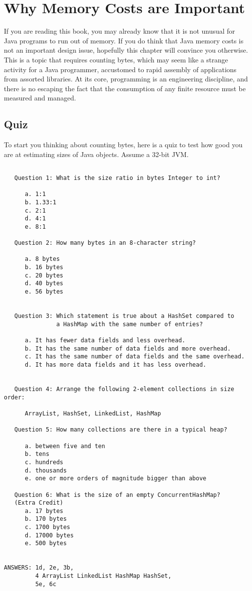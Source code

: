\chapter{Why Memory Costs are Important}

If you are reading this book, you may already know that it is not unusual for Java programs to run out of memory. If you do think that Java memory costs is not an important design issue, hopefully this chapter will convince you otherwise. This is a topic that requires counting bytes, which may seem like a strange activity for a Java programmer, accustomed to rapid assembly of applications from assorted libraries. At its core, programming is an engineering discipline, and there is no escaping the fact that the consumption of any finite resource must be measured and managed. 

\section{Quiz}

To start you thinking about counting bytes, here is a quiz to test how good you are at estimating sizes of Java objects. Assume a 32-bit JVM.
\begin{verbatim}

   Question 1: What is the size ratio in bytes Integer to int?
   
      a. 1:1
      b. 1.33:1
      c. 2:1
      d. 4:1
      e. 8:1
   
   Question 2: How many bytes in an 8-character string?

      a. 8 bytes
      b. 16 bytes
      c. 20 bytes
      d. 40 bytes
      e. 56 bytes
 
   
   Question 3: Which statement is true about a HashSet compared to 
               a HashMap with the same number of entries?
               
      a. It has fewer data fields and less overhead.
      b. It has the same number of data fields and more overhead.
      c. It has the same number of data fields and the same overhead.
      d. It has more data fields and it has less overhead.
                  
                       
   Question 4: Arrange the following 2-element collections in size order:
    
      ArrayList, HashSet, LinkedList, HashMap
          
   Question 5: How many collections are there in a typical heap?
   
      a. between five and ten
      b. tens
      c. hundreds
      d. thousands
      e. one or more orders of magnitude bigger than above

   Question 6: What is the size of an empty ConcurrentHashMap?
   (Extra Credit)
      a. 17 bytes
      b. 170 bytes
      c. 1700 bytes
      d. 17000 bytes
      e. 500 bytes
           

ANSWERS: 1d, 2e, 3b, 
         4 ArrayList LinkedList HashMap HashSet, 
         5e, 6c                 
\end{verbatim}

